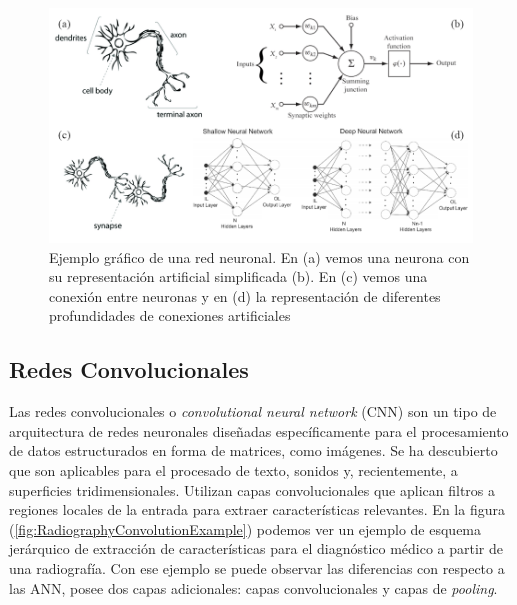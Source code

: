 \begin{figure}[htp]
  \centering
  \includegraphics[width=\textwidth]{imagenes/chapter2/ANNVisualization.png}
  \caption{Ejemplo gráfico de una red neuronal\cite{
    NeuronImages, NeuronSimilarity, ShallowAndDeepNN
    }. En (a) vemos una neurona con 
  su representación artificial simplificada (b). En (c) vemos una conexión entre 
  neuronas y en (d) la representación de diferentes profundidades de conexiones artificiales}
  \label{fig:ANNVisualization}
\end{figure}

\subsection{Redes Convolucionales} 
Las redes convolucionales o \emph{convolutional neural network} (CNN)\cite{ConvolutionalZipCode, ConvolutionInRadiology}
son un tipo de arquitectura de redes neuronales diseñadas 
específicamente para el procesamiento de datos estructurados en forma de matrices, como imágenes.
Se ha descubierto que son aplicables para el procesado de texto, sonidos y, recientemente,
a superficies tridimensionales.
Utilizan capas convolucionales que aplican filtros a regiones locales de la entrada 
para extraer características relevantes. En la figura (\ref{fig:RadiographyConvolutionExample})
podemos ver un ejemplo de esquema jerárquico de extracción de características para el 
diagnóstico médico a partir de una radiografía. Con ese ejemplo se puede observar 
las diferencias con respecto a las ANN, posee dos capas adicionales: capas convolucionales 
y capas de \emph{pooling}.

